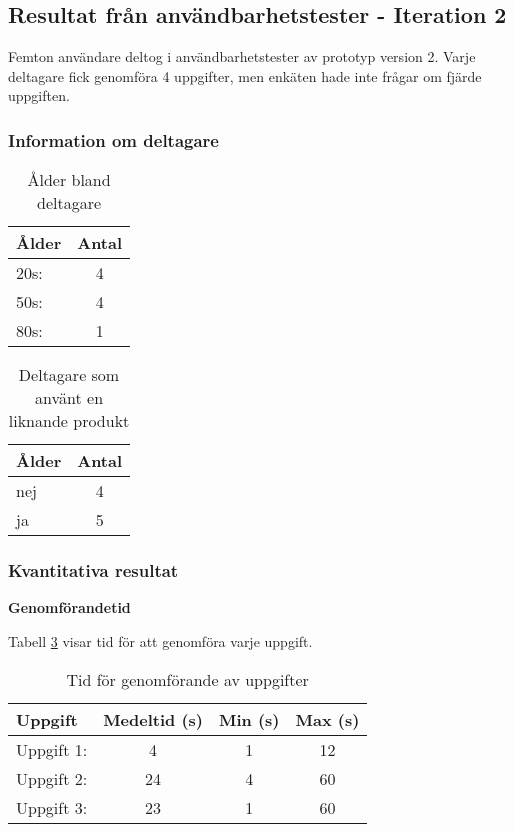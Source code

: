 \subsection{Resultat från användbarhetstester - Iteration 2}

Femton användare deltog i användbarhetstester av prototyp version 2. Varje deltagare fick genomföra 4 uppgifter, men enkäten hade inte frågar om fjärde uppgiften. 

\subsubsection{Information om deltagare}

\begin{table}[H]
\centering
\begin{tabular}{|l|c|}
\hline
\textbf{Ålder} & \textbf{Antal} \\
\hline
20s:  & 4  \\ 
50s:  & 4  \\
80s:  & 1  \\
\hline
\end{tabular}
\caption{Ålder bland deltagare}
\label{tab:age1}
\end{table}

\begin{table}[H]
\centering
\begin{tabular}{|l|c|}
\hline
\textbf{Ålder} & \textbf{Antal} \\
\hline
nej  & 4   \\
ja  & 5  \\
\hline
\end{tabular}
\caption{Deltagare som använt en liknande produkt}
\label{tab:exp1}
\end{table}



\subsubsection{Kvantitativa resultat}

\textbf{Genomförandetid}

Tabell \ref{tab:tid2} visar tid för att genomföra varje uppgift.

\begin{table}[h]
\centering
\begin{tabular}{|l|c|c|c|}
\hline
\textbf{Uppgift} & \textbf{Medeltid (s)} & \textbf{Min (s)} & \textbf{Max (s)} \\
\hline
Uppgift 1:  & 4 & 1 & 12 \\
Uppgift 2:  & 24 & 4 & 60\\
Uppgift 3:  & 23 & 1 & 60\\
\hline
\end{tabular}
\caption{Tid för genomförande av uppgifter}
\label{tab:tid2}
\end{table}

